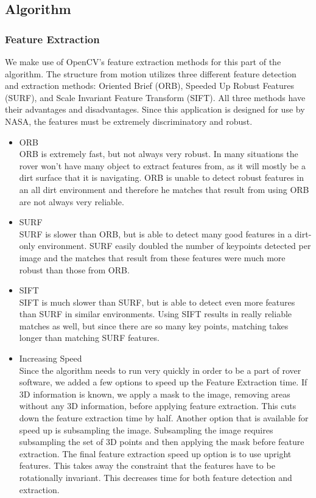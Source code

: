 \subsection{Algorithm}

\subsubsection{Feature Extraction}
	We make use of OpenCV's feature extraction methods for this part of the algorithm. The structure from motion utilizes three different feature detection and extraction methods: Oriented Brief (ORB), Speeded Up Robust Features (SURF), and Scale Invariant Feature Transform (SIFT). All three methods have their advantages and disadvantages. Since this application is designed for use by NASA, the features must be extremely discriminatory and robust.
\begin{itemize} 
\item{ORB} \\
	ORB is extremely fast, but not always very robust. In many situations the rover won't have many object to extract features from, as it will mostly be a dirt surface that it is navigating. ORB is unable to detect robust features in an all dirt environment and therefore he matches that result from using ORB are not always very reliable.
\item{SURF} \\
	SURF is slower than ORB, but is able to detect many good features in a dirt-only environment. SURF easily doubled the number of keypoints detected per image and the matches that result from these features were much more robust than those from ORB.
\item{SIFT} \\
	SIFT is much slower than SURF, but is able to detect even more features than SURF in similar environments. Using SIFT results in really reliable matches as well, but since there are so many key points, matching takes longer than matching SURF features.
\item{Increasing Speed} \\
	Since the algorithm needs to run very quickly in order to be a part of rover software, we added a few options to speed up the Feature Extraction time. If 3D information is known, we apply a mask to the image, removing areas without any 3D information, before applying feature extraction. This cuts down the feature extraction time by half. Another option that is available for speed up is subsampling the image. Subsampling the image requires subsampling the set of 3D points and then applying the mask before feature extraction. The final feature extraction speed up option is to use upright features. This takes away the constraint that the features have to be rotationally invariant. This decreases time for both feature detection and extraction.
\end{itemize}

